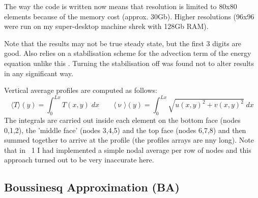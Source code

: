 The way the code is written now means that resolution is limited to 80x80 elements 
because of the memory cost (approx. 30Gb). Higher resolutions (96x96 were run on my 
super-desktop machine shrek with 128Gb RAM).

Note that the \aspect results may not be true steady state, but the first 3 digits are good.
Also \aspect relies on a stabilisation scheme for the advection term of the energy equation
unlike this \stone. Turning the stabilisation off was found not to alter results in any 
significant way.

Vertical average profiles are computed as follows:
\[
\langle T \rangle (y) = \int_0^{Lx} T(x,y) \; dx 
\qquad
\langle \upnu \rangle (y) = \int_0^{Lx} \sqrt{u(x,y)^2+v(x,y)^2} \; dx 
\]
The integrals are carried out inside each element on the bottom face (nodes 0,1,2),
the 'middle face' (nodes 3,4,5) and the top face (nodes 6,7,8) and then summed together
to arrive at the profile (the profiles arrays are nny long). 
Note that in \stone~1 I had implemented a simple nodal average
per row of nodes and this approach turned out to be very inaccurate here.   

\newpage
\subsection*{Boussinesq Approximation (BA)}

